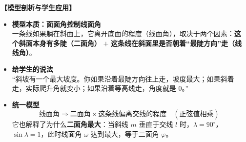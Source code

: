 \documentclass[11pt,a4paper]{ctexart}
\begin{document}
\noindent\textbf{【模型剖析与学生应用】}
\begin{itemize}
    \item \textbf{模型本质：面面角控制线面角} \\
    一条线如果躺在斜面上，它离开底面的程度（线面角），取决于两个因素：\textbf{这个斜面本身有多陡（二面角）} $+$ \textbf{这条线在斜面里是否朝着“最陡方向”走（线线角）}。
    \item \textbf{给学生的说法} \\
    “斜坡有一个最大坡度。你如果沿着最陡方向往上走，坡度最大；如果斜着走，实际爬升角就变小；如果沿着等高线走，角度就是 0。”
    \item \textbf{统一模型} \\
    \[ \text{线面角} \Rightarrow \text{二面角} \times \text{这条线偏离交线的程度} \quad (\text{正弦值相乘}) \]
    它也解释了为什么\textbf{二面角最大}：当斜线 $m$ 垂直于交线 $l$ 时，$\lambda = 90^\circ$，$\sin\lambda = 1$，此时线面角 $\omega$ 达到最大，等于二面角 $\varphi$。
\end{itemize}
\end{document}
